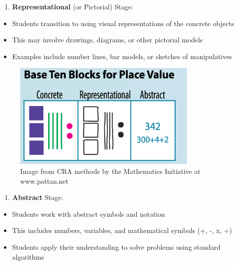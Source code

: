 \documentclass[
  letterpaper,
  DIV=11,
  numbers=noendperiod]{scrartcl}
\providecommand{\tightlist}{%
  \setlength{\itemsep}{0pt}\setlength{\parskip}{0pt}}\usepackage{longtable,booktabs,array}
\begin{document}
\begin{enumerate}
\def\labelenumi{\arabic{enumi}.}
\setcounter{enumi}{1}
\tightlist
\item
  \textbf{Representational} (or Pictorial) Stage:
\end{enumerate}

\begin{itemize}
\tightlist
\item
  Students transition to using visual representations of the concrete
  objects
\item
  This may involve drawings, diagrams, or other pictorial models
\item
  Examples include number lines, bar models, or sketches of
  manipulatives
\end{itemize}

\begin{figure}[H]

{\centering \includegraphics[width=0.8\textwidth,height=\textheight]{../img/mod03/cra-base-ten-blocks-place-value.png}

}

\caption{Image from CRA methods by the Mathematics Initiative at
www.pattan.net}

\end{figure}%

\begin{enumerate}
\def\labelenumi{\arabic{enumi}.}
\setcounter{enumi}{2}
\tightlist
\item
  \textbf{Abstract} Stage:
\end{enumerate}

\begin{itemize}
\tightlist
\item
  Students work with abstract symbols and notation
\item
  This includes numbers, variables, and mathematical symbols (+, -, x,
  ÷)
\item
  Students apply their understanding to solve problems using standard
  algorithms
\end{itemize}
\end{document}
